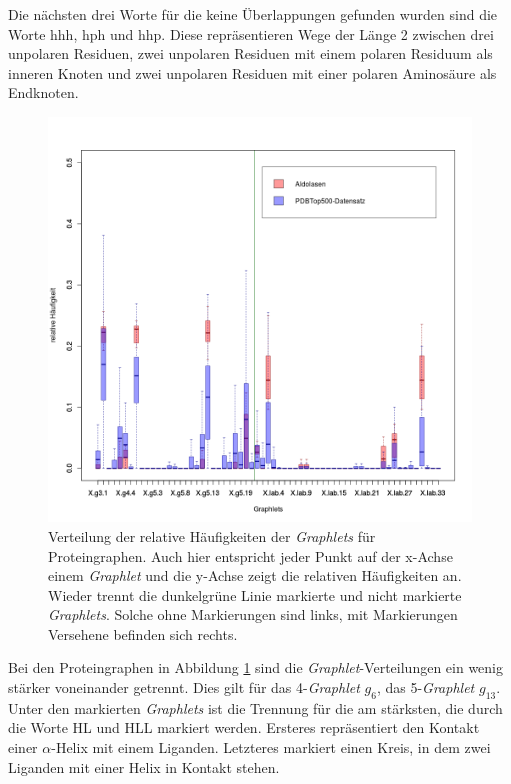 \documentclass{report}
\begin{document}
Die n\"achsten drei Worte f\"ur die keine \"Uberlappungen gefunden wurden sind die Worte hhh, hph und hhp. Diese repr\"asentieren Wege der L\"ange 2 zwischen drei unpolaren Residuen, zwei unpolaren Residuen mit einem polaren Residuum als inneren Knoten und zwei unpolaren Residuen mit einer polaren Aminos\"aure als Endknoten.


\begin{figure}

\includegraphics[scale=0.55]{pg_plot.png}
\caption{Verteilung der relative H\"aufigkeiten der \textit{Graphlets} f\"ur Proteingraphen. Auch hier entspricht jeder Punkt auf der x-Achse einem \textit{Graphlet} und die y-Achse zeigt die relativen H\"aufigkeiten an. Wieder trennt die dunkelgr\"une Linie markierte und nicht markierte \textit{Graphlets}. Solche ohne Markierungen sind links, mit Markierungen Versehene befinden sich rechts.}
\label{fig:pgplot}
\end{figure}

Bei den Proteingraphen in Abbildung \ref{fig:pgplot} sind die \textit{Graphlet}-Verteilungen ein wenig st\"arker voneinander getrennt.  
Dies gilt f\"ur das 4-\textit{Graphlet} $g_6$, das 5-\textit{Graphlet} $g_13$. Unter den markierten \textit{Graphlets} ist die Trennung f\"ur die am st\"arksten, die durch die Worte HL und HLL markiert werden. Ersteres repr\"asentiert den Kontakt einer $\alpha$-Helix mit einem Liganden. Letzteres markiert einen Kreis, in dem zwei Liganden mit einer Helix in Kontakt stehen.
\end{document}
